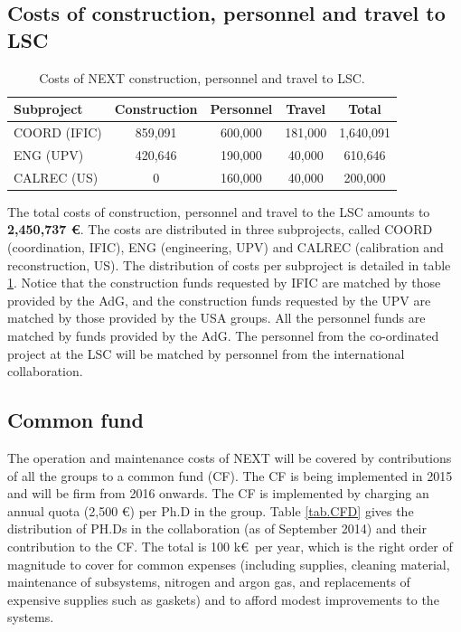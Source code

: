\documentclass[a4paper,11pt,oneside]{article}
\begin{document}



\subsection{Costs of construction, personnel and travel to LSC}
\begin{table}[h!]
\begin{center}
\begin{tabular}{|l|c|c|c|c|}
\hline
Subproject &	Construction &	Personnel  &	Travel& Total\\
\hline
COORD (IFIC)	& 859,091 &	600,000 &	181,000 &	1,640,091 \\
ENG (UPV)	& 420,646 &	190,000	& 40,000	& 610,646 \\
CALREC (US)	& 0	& 160,000	 & 40,000	& 200,000 \\
 \hline\hline
\end{tabular}  
\caption{Costs of NEXT construction, personnel and travel to LSC.}
\label{tab.CostsTotal}
\end{center}
\end{table} 

The total costs of construction, personnel and travel to the LSC amounts to 
{\bf 2,450,737 \euro}. The costs are distributed in three subprojects, called COORD (coordination, IFIC), 
ENG (engineering, UPV) and CALREC (calibration and reconstruction, US). The distribution of costs per subproject is detailed in table \ref{tab.CostsTotal}. Notice that the construction funds requested
by IFIC are matched by those provided by the AdG, and the construction funds requested by the 
UPV are matched by those provided by the USA groups. All the personnel funds are matched by 
funds provided by the AdG. The personnel from the co-ordinated project at the LSC will be matched
by personnel from the international collaboration. 

\subsection{Common fund}

The operation and maintenance costs of NEXT will be covered by contributions of all the groups to a common fund (CF). The CF is being implemented in 2015 and will be firm from 2016 onwards. The CF is implemented by charging an annual quota (2,500 \euro) per Ph.D in the group. Table \ref{tab.CFD} gives the distribution of PH.Ds in the collaboration (as of September 2014) and their contribution to the CF. The total is 100 k\euro\ per year, which is the right order of magnitude to cover for common expenses (including supplies, cleaning material, maintenance of subsystems, nitrogen and argon gas, and replacements of expensive supplies such as gaskets) and to afford modest improvements to the systems. 
\end{document}
